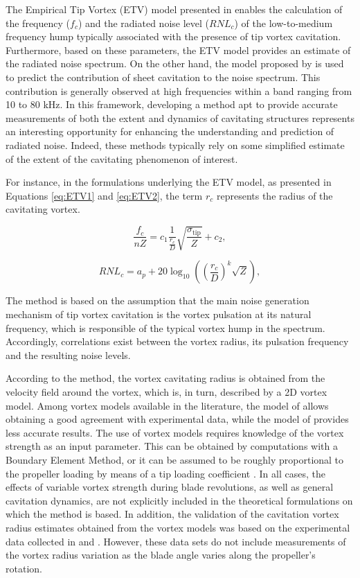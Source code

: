 The Empirical Tip Vortex (ETV) model presented in \cite{ETV_JMSE} enables the calculation of the frequency ($f_c$) and the radiated noise level ($RNL_c$) of the low-to-medium frequency hump typically associated with the presence of tip vortex cavitation. Furthermore, based on these parameters, the ETV model provides an estimate of the radiated noise spectrum.
On the other hand, the model proposed by \cite{Brown1999} is used to predict the contribution of sheet cavitation to the noise spectrum. This contribution is generally observed at high frequencies within a band ranging from 10 to 80 kHz.
In this framework, developing a method apt to provide accurate measurements of both the extent and dynamics of cavitating structures represents an interesting opportunity for enhancing the understanding and prediction of radiated noise. Indeed, these methods typically rely on some simplified estimate of the extent of the cavitating phenomenon of interest.

For instance, in the formulations underlying the ETV model, as presented in Equations \ref{eq:ETV1} and \ref{eq:ETV2}, the term $r_c$ represents the radius of the cavitating vortex.

\begin{equation}
    \frac{f_c}{nZ} = c_1 \frac{1}{\frac{r_c}{D}} \sqrt{\frac{\sigma_{\text{tip}}}{Z}} + c_2,
    \label{eq:ETV1}
\end{equation}

\begin{equation}
    RNL_c = a_p + 20 \log_{10} \left( \left( \frac{r_c}{D} \right)^k \sqrt{Z} \right),
    \label{eq:ETV2}
\end{equation}

The method is based on the assumption that the main noise generation mechanism of tip vortex cavitation is the vortex pulsation at its natural frequency, which is responsible of the typical vortex hump in the spectrum. Accordingly, correlations exist between the vortex radius, its pulsation frequency and the resulting noise levels.

According to the method, the vortex cavitating radius is obtained from the velocity field around the vortex, which is, in turn, described by a 2D vortex model. Among vortex models available in the literature, the model of \cite{Proctor2010} allows obtaining a good agreement with experimental data, while the model of \cite{Lamb1932} provides less accurate results.
The use of vortex models requires knowledge of the vortex strength as an input parameter. This can be obtained by computations with a Boundary Element Method, or it can be assumed to be roughly proportional to the propeller loading by means of a tip loading coefficient \cite{ETV_JMSE}.
In all cases, the effects of variable vortex strength during blade revolutions, as well as general cavitation dynamics, are not explicitly included in the theoretical formulations on which the method is based.
In addition, the validation of the cavitation vortex radius estimates obtained from the vortex models was based on the experimental data collected in \cite{Pennings2015} and \cite{Kuiper1981}. However, these data sets do not include measurements of the vortex radius variation as the blade angle varies along the propeller's rotation. 

